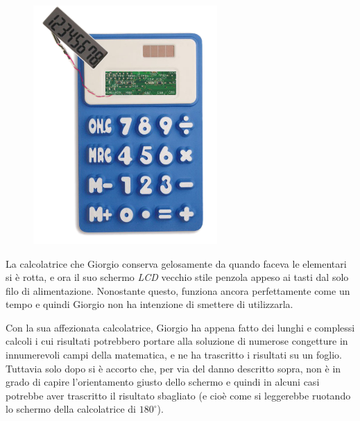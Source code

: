 \usepackage{xcolor}
\usepackage{afterpage}
\usepackage{pifont,mdframed}
\usepackage{wrapfig}
\usepackage[bottom]{footmisc}

\makeatletter
\gdef\this@inputfilename{input.txt}
\gdef\this@outputfilename{output.txt}
\makeatother

\newcommand{\inputfile}{\texttt{input.txt}}
\newcommand{\outputfile}{\texttt{output.txt}}

\newenvironment{warning}
  {\par\begin{mdframed}[linewidth=2pt,linecolor=gray]%
    \begin{list}{}{\leftmargin=1cm
                   \labelwidth=\leftmargin}\item[\Large\ding{43}]}
  {\end{list}\end{mdframed}\par}

	\begin{figure}
	\centering\includegraphics[width=7cm]{calcolatrice.png}
	\end{figure}

	La calcolatrice che Giorgio conserva gelosamente da quando faceva le elementari si è rotta, e ora il suo schermo \emph{LCD} vecchio stile penzola appeso ai tasti dal solo filo di alimentazione. Nonostante questo, funziona ancora perfettamente come un tempo e quindi Giorgio non ha intenzione di smettere di utilizzarla.

	Con la sua affezionata calcolatrice, Giorgio ha appena fatto dei lunghi e complessi calcoli i cui risultati potrebbero portare alla soluzione di numerose congetture in innumerevoli campi della matematica, e ne ha trascritto i risultati su un foglio. Tuttavia solo dopo si è accorto che, per via del danno descritto sopra, non è in grado di capire l'orientamento giusto dello schermo e quindi in alcuni casi potrebbe aver trascritto il risultato sbagliato (e cioè come si leggerebbe ruotando lo schermo della calcolatrice di $180^\circ$).

